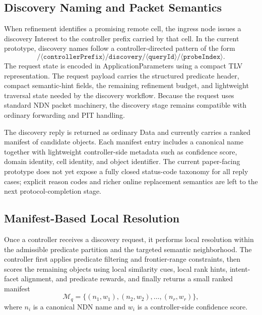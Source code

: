 \documentclass[journal]{IEEEtran}
\newcommand{\ap}{ApplicationParameters}
\begin{document}
\subsection{Discovery Naming and Packet Semantics}

When refinement identifies a promising remote cell, the ingress node issues a discovery Interest to the controller prefix carried by that cell. In the current prototype, discovery names follow a controller-directed pattern of the form
\begin{equation}
/\langle \texttt{controllerPrefix} \rangle/\texttt{discovery}/\langle \texttt{queryId} \rangle/\langle \texttt{probeIndex} \rangle.
\end{equation}
The request state is encoded in \ap{} using a compact TLV representation. The request payload carries the structured predicate header, compact semantic-hint fields, the remaining refinement budget, and lightweight traversal state needed by the discovery workflow. Because the request uses standard NDN packet machinery, the discovery stage remains compatible with ordinary forwarding and PIT handling.

The discovery reply is returned as ordinary Data and currently carries a ranked manifest of candidate objects. Each manifest entry includes a canonical name together with lightweight controller-side metadata such as confidence score, domain identity, cell identity, and object identifier. The current paper-facing prototype does not yet expose a fully closed status-code taxonomy for all reply cases; explicit reason codes and richer online replacement semantics are left to the next protocol-completion stage.

\subsection{Manifest-Based Local Resolution}

Once a controller receives a discovery request, it performs local resolution within the admissible predicate partition and the targeted semantic neighborhood. The controller first applies predicate filtering and frontier-range constraints, then scores the remaining objects using local similarity cues, local rank hints, intent-facet alignment, and predicate rewards, and finally returns a small ranked manifest
\begin{equation}
\mathcal{M}_q=\{(n_1,w_1),(n_2,w_2),\ldots,(n_r,w_r)\},
\end{equation}
where $n_i$ is a canonical NDN name and $w_i$ is a controller-side confidence score.
\end{document}
